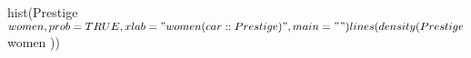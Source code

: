 \begin{Schunk}
\begin{Sinput}
 hist(Prestige$women, prob = TRUE, xlab = "women (car::Prestige)", main = "")
 lines(density(Prestige$women ))
\end{Sinput}
\end{Schunk}
